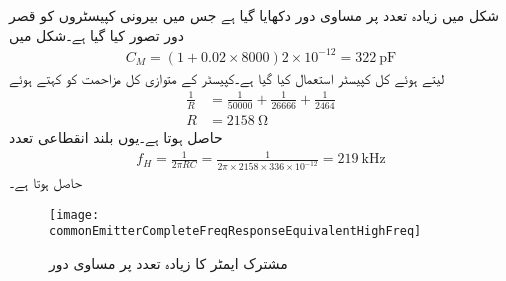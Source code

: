 شکل  میں زیادہ تعدد پر مساوی دور دکھایا گیا ہے جس میں بیرونی کپیسٹروں کو قصر    دور تصور کیا گیا ہے۔شکل میں
\begin{align*}
C_M=\left(1+0.02 \times 8000 \right)  2 \times 10^{-12}=\SI{322}{\pico \farad}
\end{align*}
لیتے ہوئے کل کپیسٹر  استعمال کیا گیا ہے۔کپیسٹر کے متوازی کل مزاحمت کو  کہتے ہوئے
\begin{align*}
\frac{1}{R}&=\frac{1}{50000}+\frac{1}{26666}+\frac{1}{2464}\\
R&=\SI{2158}{\ohm}
\end{align*}
حاصل ہوتا ہے۔یوں بلند انقطاعی تعدد 
\begin{align*}
f_H=\frac{1}{2 \pi R C}=\frac{1}{2 \pi \times 2158 \times 336 \times 10^{-12}}=\SI{219}{\kilo \hertz}
\end{align*}
حاصل ہوتا ہے۔
\begin{figure}
\centering
\texttt{[image: commonEmitterCompleteFreqResponseEquivalentHighFreq]}
\caption{مشترک ایمٹر کا زیادہ تعدد پر مساوی دور}
\label{شکل_تعددی_ردعمل_مشترک_مخارج_مکمل_تعددی_ردعمل_زیادہ_تعددی_مساوی}
\end{figure}

